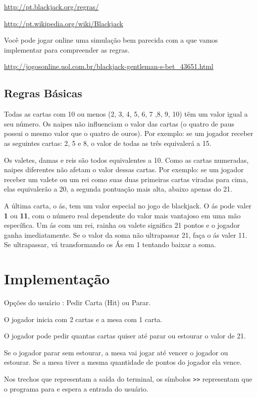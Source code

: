 \documentclass[12pt]{article}
\renewcommand{\bf}[1]{\textbf{#1}}
\begin{document}
\url{http://pt.blackjack.org/regras/}

\url{http://pt.wikipedia.org/wiki/Blackjack}

Você pode jogar online uma simulação bem parecida com a que vamos implementar para compreender as regras.

\url{http://jogosonline.uol.com.br/blackjack-gentleman-s-bet_43651.html}

\subsection{Regras Básicas}

Todas as cartas com 10 ou menos (2, 3, 4, 5, 6, 7 ,8, 9, 10) têm um valor igual a seu número. Os naipes não influenciam o valor das cartas (o quatro de paus possui o mesmo valor que o quatro de ouros). Por exemplo: se um jogador receber as seguintes cartas: 2, 5 e 8, o valor de todas as três equivalerá a 15.

Os valetes, damas e reis são todos equivalentes a 10. Como as cartas numeradas, naipes diferentes não afetam o valor dessas cartas. Por exemplo: se um jogador receber um valete ou um rei como suas duas primeiras cartas viradas para cima, elas equivalerão a 20, a segunda pontuação mais alta, abaixo apenas do 21.

A última carta, o ás, tem um valor especial no jogo de blackjack. O ás pode valer \bf{1} ou \bf{11}, com o número real dependente do valor mais vantajoso em uma mão específica. Um ás com um rei, rainha ou valete significa 21 pontos e o jogador ganha imediatamente. Se o valor da soma não ultrapassar 21, faça o ás valer 11. Se ultrapassar, vá transformando os Ás em 1 tentando baixar a soma.

\section{Implementação}
Opções do usuário : Pedir Carta (Hit) ou Parar.

O jogador inicia com 2 cartas e a mesa com 1 carta.

O jogador pode pedir quantas cartas quiser até parar
ou estourar o valor de 21.

Se o jogador parar sem estourar, a mesa vai jogar até
vencer o jogador ou estourar. Se a mesa tiver a mesma
quantidade de pontos do jogador ela vence.

Nos trechos que representam a saída do terminal, os símbolos \verb|>>| representam que o programa para e espera a entrada do usuário.
\end{document}
